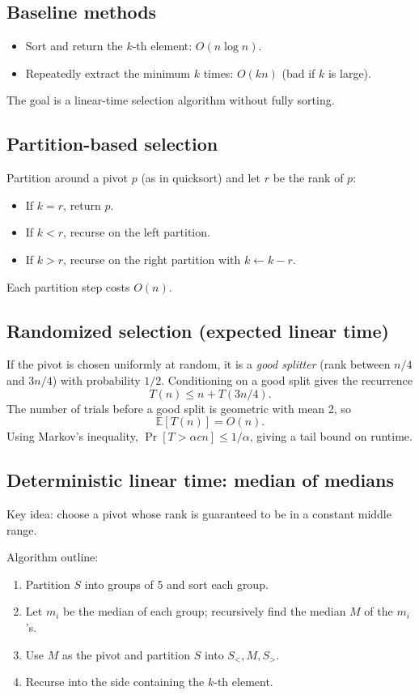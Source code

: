 \documentclass[11pt]{article}
\begin{document}
{{{\subsection*{Baseline methods}
\begin{itemize}
\item Sort and return the $k$-th element: $O(n \log n)$.
\item Repeatedly extract the minimum $k$ times: $O(kn)$ (bad if $k$ is large).
\end{itemize}
The goal is a linear-time selection algorithm without fully sorting.

\subsection*{Partition-based selection}
Partition around a pivot $p$ (as in quicksort) and let $r$ be the rank of $p$:
\begin{itemize}
\item If $k=r$, return $p$.
\item If $k<r$, recurse on the left partition.
\item If $k>r$, recurse on the right partition with $k \leftarrow k-r$.
\end{itemize}
Each partition step costs $O(n)$.

\subsection*{Randomized selection (expected linear time)}
If the pivot is chosen uniformly at random, it is a \emph{good splitter} (rank between
$n/4$ and $3n/4$) with probability $1/2$. Conditioning on a good split gives the recurrence
\[
T(n) \le n + T(3n/4).
\]
The number of trials before a good split is geometric with mean 2, so
\[
\mathbb{E}[T(n)] = O(n).
\]
Using Markov's inequality, $\Pr[T > \alpha c n] \le 1/\alpha$, giving a tail bound on runtime.

\subsection*{Deterministic linear time: median of medians}
Key idea: choose a pivot whose rank is guaranteed to be in a constant middle range.

Algorithm outline:
\begin{enumerate}
\item Partition $S$ into groups of 5 and sort each group.
\item Let $m_i$ be the median of each group; recursively find the median $M$ of the $m_i$'s.
\item Use $M$ as the pivot and partition $S$ into $S_<, M, S_>$.
\item Recurse into the side containing the $k$-th element.
\end{enumerate}

}}}
\end{document}
